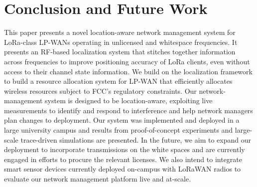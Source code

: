 \section{Conclusion and Future Work}
\label{sec:conclusion-future-work}
This paper presents a novel location-aware network management system for LoRa-class LP-WANs operating in unlicensed and whitespace frequencies. It presents an RF-based localization system that 
stitches together information across frequencies to improve positioning accuracy of LoRa clients, even without access to their channel state information. We build on the localization framework to build a resource allocation system for LP-WAN that efficiently allocates wireless resources subject to FCC's regulatory constraints.  Our network-management system  is designed to be location-aware, exploiting live measurements to identify and respond to interference and help network managers plan changes to deployment. Our system was implemented and deployed in a large university campus and results from proof-of-concept experiments and large-scale trace-driven simulations are presented. In the future, we aim to expand our deployment to incorporate transmissions on the white spaces and are currently engaged in efforts to procure the relevant licenses. We also intend to integrate smart sensor devices currently deployed on-campus with LoRaWAN radios to evaluate our network management platform live and at-scale. 